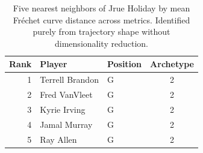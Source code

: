 \begin{table}[htbp]
  \centering\small
  \begin{tabular}{rllc}
    \toprule
    Rank & Player & Position & Archetype \\
    \midrule
    1 & Terrell Brandon & G & 2 \\
    2 & Fred VanVleet & G & 2 \\
    3 & Kyrie Irving & G & 2 \\
    4 & Jamal Murray & G & 2 \\
    5 & Ray Allen & G & 2 \\
    \bottomrule
  \end{tabular}
  \caption{Five nearest neighbors of Jrue Holiday by mean Fr\'{e}chet curve distance across metrics. Identified purely from trajectory shape without dimensionality reduction.}
  \label{tab:Jrue_Holiday_frechet_curve_neighbors}
\end{table}

